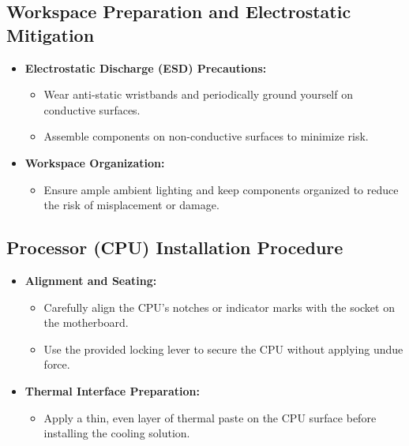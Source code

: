 \documentclass{article}
\begin{document}
\subsection{Workspace Preparation and Electrostatic Mitigation}
\begin{itemize}[itemsep=5pt]
    \item \textbf{Electrostatic Discharge (ESD) Precautions:}
    \begin{itemize}[label=--]
        \item Wear anti-static wristbands and periodically ground yourself on conductive surfaces.
        \item Assemble components on non-conductive surfaces to minimize risk.
    \end{itemize}
    \item \textbf{Workspace Organization:}
    \begin{itemize}[label=--]
        \item Ensure ample ambient lighting and keep components organized to reduce the risk of misplacement or damage.
    \end{itemize}
\end{itemize}

\subsection{Processor (CPU) Installation Procedure}
\begin{itemize}[itemsep=5pt]
    \item \textbf{Alignment and Seating:}
    \begin{itemize}[label=--]
        \item Carefully align the CPU’s notches or indicator marks with the socket on the motherboard.
        \item Use the provided locking lever to secure the CPU without applying undue force.
    \end{itemize}
    \item \textbf{Thermal Interface Preparation:}
    \begin{itemize}[label=--]
        \item Apply a thin, even layer of thermal paste on the CPU surface before installing the cooling solution.
    \end{itemize}
\end{itemize}
\end{document}
